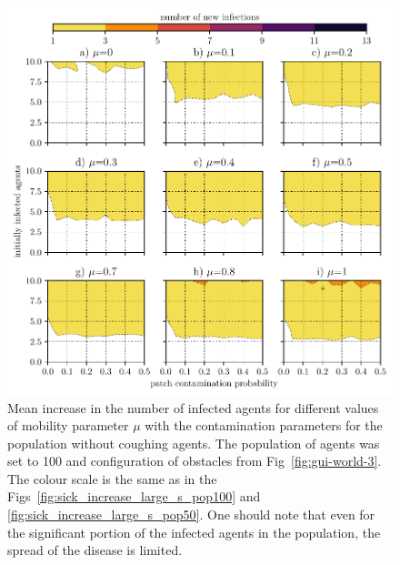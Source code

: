 \documentclass[10pt,a4paper]{article}
\begin{document}
\begin{figure}[ht!]
\begin{center}
\includegraphics[scale=0.75]{plots/sick_increase_small_s_pop100_world-3.pdf}
\end{center}
\caption{Mean increase in the number of infected agents for different values of mobility parameter $\mu$ with the contamination parameters for the population without coughing agents. The population of agents was set to 100 and configuration of obstacles from Fig~\ref{fig:gui-world-3}. The colour scale is the same as in the Figs~\ref{fig:sick_increase_large_s_pop100} and \ref{fig:sick_increase_large_s_pop50}. One should note that even for the significant portion of the infected agents in the population, the spread of the disease is limited.}
\label{fig:sick_increase_small_s_pop100_world-3}
\end{figure}
\end{document}
